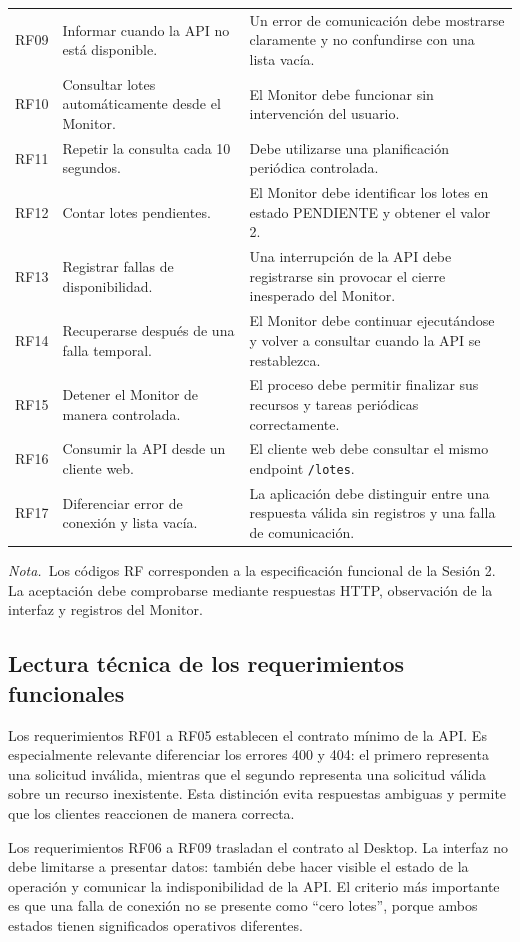 \documentclass[12pt,letterpaper]{article}
\newcommand{\tablaNota}[1]{\par\smallskip\noindent\textit{Nota.}~#1}
\begin{document}
\begin{table}[!ht]
\begin{tabularx}{\textwidth}{@{}P{1.25cm}P{4.05cm}Y@{}}
RF09 & Informar cuando la API no está disponible. & Un error de comunicación debe mostrarse claramente y no confundirse con una lista vacía.\\
RF10 & Consultar lotes automáticamente desde el Monitor. & El Monitor debe funcionar sin intervención del usuario.\\
RF11 & Repetir la consulta cada 10 segundos. & Debe utilizarse una planificación periódica controlada.\\
RF12 & Contar lotes pendientes. & El Monitor debe identificar los lotes en estado PENDIENTE y obtener el valor 2.\\
RF13 & Registrar fallas de disponibilidad. & Una interrupción de la API debe registrarse sin provocar el cierre inesperado del Monitor.\\
RF14 & Recuperarse después de una falla temporal. & El Monitor debe continuar ejecutándose y volver a consultar cuando la API se restablezca.\\
RF15 & Detener el Monitor de manera controlada. & El proceso debe permitir finalizar sus recursos y tareas periódicas correctamente.\\
RF16 & Consumir la API desde un cliente web. & El cliente web debe consultar el mismo endpoint \texttt{/lotes}.\\
RF17 & Diferenciar error de conexión y lista vacía. & La aplicación debe distinguir entre una respuesta válida sin registros y una falla de comunicación.\\
\bottomrule
\end{tabularx}
\tablaNota{Los códigos RF corresponden a la especificación funcional de la Sesión 2. La aceptación debe comprobarse mediante respuestas HTTP, observación de la interfaz y registros del Monitor.}
\end{table}

\subsection{Lectura técnica de los requerimientos funcionales}
Los requerimientos RF01 a RF05 establecen el contrato mínimo de la API. Es especialmente relevante diferenciar los errores 400 y 404: el primero representa una solicitud inválida, mientras que el segundo representa una solicitud válida sobre un recurso inexistente. Esta distinción evita respuestas ambiguas y permite que los clientes reaccionen de manera correcta.

Los requerimientos RF06 a RF09 trasladan el contrato al Desktop. La interfaz no debe limitarse a presentar datos: también debe hacer visible el estado de la operación y comunicar la indisponibilidad de la API. El criterio más importante es que una falla de conexión no se presente como “cero lotes”, porque ambos estados tienen significados operativos diferentes.
\end{document}
